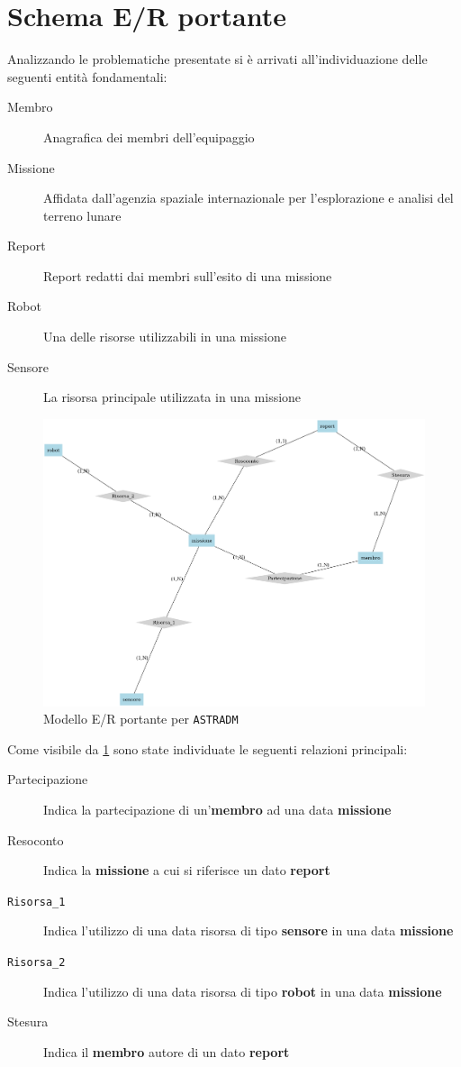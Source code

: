 \section{Schema E/R portante}
Analizzando le problematiche presentate si è arrivati all'individuazione delle
seguenti entità fondamentali:
\begin{description}
\item[Membro] Anagrafica dei membri dell'equipaggio
\item[Missione] Affidata dall'agenzia spaziale internazionale per l'esplorazione e analisi del
  terreno lunare
\item[Report] Report redatti dai membri sull'esito di una missione
\item[Robot] Una delle risorse utilizzabili in una missione
\item[Sensore] La risorsa principale utilizzata in una missione
\end{description}
\begin{figure}
\includegraphics[width=\linewidth]{images/er-portante.png}
\caption{Modello E/R portante per \texttt{ASTRADM}}
\label{fig:er-portante}
\end{figure}           
Come visibile da \ref{fig:er-portante} sono state individuate le seguenti relazioni principali:
\begin{description}
\item[Partecipazione] Indica la partecipazione di un'\textbf{membro} ad una
  data \textbf{missione}
\item[Resoconto] Indica la \textbf{missione} a cui si riferisce un dato \textbf{report}
\item[\texttt{Risorsa\_1}] Indica l'utilizzo di una data risorsa di
  tipo \textbf{sensore} in una data \textbf{missione}
\item[\texttt{Risorsa\_2}] Indica l'utilizzo di una data risorsa di
  tipo \textbf{robot} in una data \textbf{missione}
\item[Stesura] Indica il \textbf{membro} autore di un dato \textbf{report}
\end{description}


